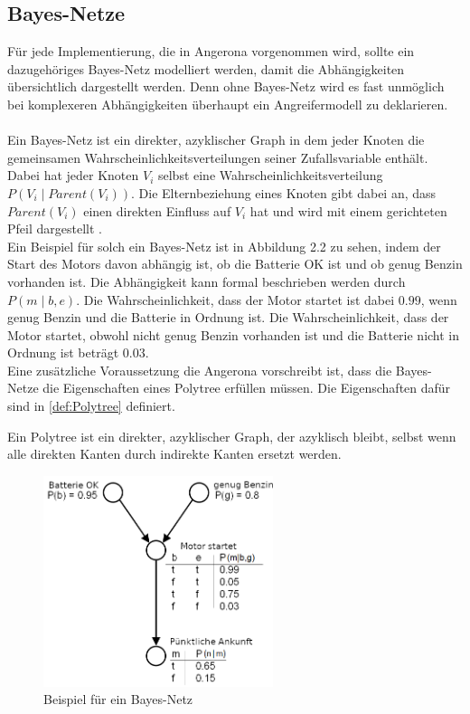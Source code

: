 \documentclass[german,version-2020-11]{uzl-thesis}
\begin{document}
\subsection{Bayes-Netze}
Für jede Implementierung, die in Angerona vorgenommen wird, sollte ein dazugehöriges Bayes-Netz modelliert werden, damit die Abhängigkeiten übersichtlich dargestellt werden. Denn ohne Bayes-Netz  wird es fast unmöglich bei komplexeren Abhängigkeiten überhaupt ein Angreifermodell zu deklarieren.  \\ \\
Ein Bayes-Netz ist ein direkter, azyklischer Graph in dem jeder Knoten die gemeinsamen Wahrscheinlichkeitsverteilungen seiner Zufallsvariable enthält. Dabei hat jeder Knoten $V_i$ selbst eine Wahrscheinlichkeitsverteilung $P(V_i \mid Parent(V_i) )$. Die Elternbeziehung eines Knoten gibt dabei an, dass $Parent(V_i) $ einen direkten Einfluss auf $V_i$ hat und wird  mit einem gerichteten Pfeil dargestellt \cite{3}.\\  Ein Beispiel für solch ein Bayes-Netz ist in Abbildung 2.2 zu sehen, indem der Start des Motors davon abhängig ist, ob die Batterie OK ist und ob genug Benzin vorhanden ist. Die Abhängigkeit kann formal beschrieben werden durch $P(m \mid b,e)$. Die Wahrscheinlichkeit, dass der Motor startet ist dabei $0.99$, wenn genug Benzin und die Batterie in Ordnung ist. Die Wahrscheinlichkeit, dass der Motor startet, obwohl nicht genug Benzin vorhanden ist und die Batterie nicht in Ordnung ist beträgt $0.03$. \\
Eine zusätzliche Voraussetzung die Angerona vorschreibt ist, dass die Bayes-Netze die Eigenschaften eines Polytree erfüllen müssen. Die Eigenschaften dafür sind in \cref{def:Polytree} definiert.
 \begin{definition}[Polytree]\label{def:Polytree}
	Ein Polytree ist ein direkter, azyklischer Graph, der azyklisch bleibt, selbst wenn alle direkten Kanten durch indirekte Kanten ersetzt werden.
\end{definition}
\begin{figure}[ht]
	\centering
	\includegraphics[width=0.6\textwidth]{bayes-netz-bsp.PNG}
	\caption{Beispiel für ein Bayes-Netz \cite{10}}
	\label{fig}
\end{figure}
\end{document}
